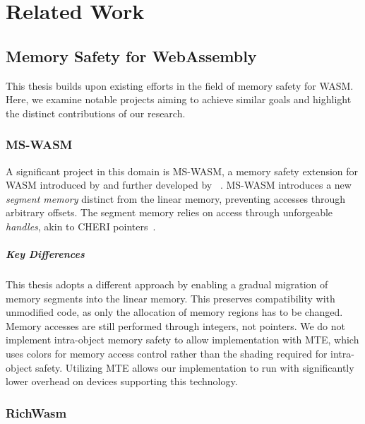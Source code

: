 \chapter{Related Work}
\label{ch:related}

\section{Memory Safety for WebAssembly}
\label{sec:related-memory-safety-for-webassembly}

This thesis builds upon existing efforts in the field of memory safety for \ac{WASM}.
Here, we examine notable projects aiming to achieve similar goals and highlight the distinct contributions of our research.

\subsection{MS-WASM}
\label{subsec:ms-wasm}

A significant project in this domain is MS-WASM, a memory safety extension for WASM introduced by \citeauthor*{disselkoen2019position} and further developed by \citeauthor*{michael2023mswasm}~\cite{disselkoen2019position,michael2023mswasm}.
MS-WASM introduces a new \textit{segment memory} distinct from the linear memory, preventing accesses through arbitrary offsets.
The segment memory relies on access through unforgeable \textit{handles}, akin to CHERI pointers~\cite{woodruff2014cheri}.

\paragraph{Key Differences}
This thesis adopts a different approach by enabling a gradual migration of memory segments into the linear memory.
This preserves compatibility with unmodified code, as only the allocation of memory regions has to be changed.
Memory accesses are still performed through integers, not pointers.
We do not implement intra-object memory safety to allow implementation with \ac{MTE}, which uses colors for memory access control rather than the shading required for intra-object safety.
Utilizing \ac{MTE} allows our implementation to run with significantly lower overhead on devices supporting this technology.

\subsection{RichWasm}
\label{subsec:richwasm}

